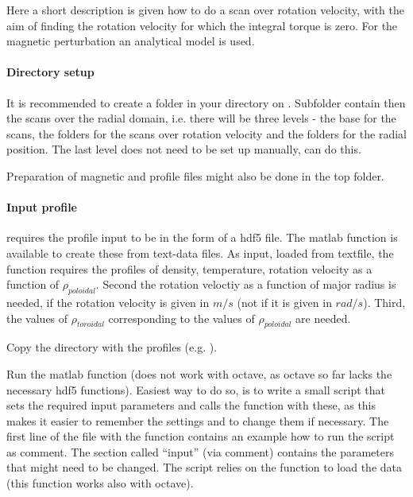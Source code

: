 Here a short description is given how to do a scan over rotation
velocity, with the aim of finding the rotation velocity for which the
integral torque is zero.
For the magnetic perturbation an analytical model is used.

\paragraph{Directory setup}
It is recommended to create a folder in your directory on .
Subfolder contain then the scans over the radial domain, i.e. there
will be three levels - the base for the scans, the folders for the scans
over rotation velocity and the folders for the radial position. The last
level does not need to be set up manually, \neotwo can do this.

Preparation of magnetic and profile files might also be done in the top
folder.

\paragraph{Input profile}
\neotwo requires the profile input to be in the form of a hdf5 file. The
matlab function  is available to create
these from text-data files. As input, loaded from textfile, the function
requires the profiles of density, temperature, rotation velocity as a
function of $\rho_{poloidal}$. Second the rotation veloctiy as a
function of major radius is needed, if the rotation velocity is given in
$m/s$ (not if it is given in $rad/s$). Third, the values of
$\rho_{toroidal}$ corresponding to the values of $\rho_{poloidal}$ are
needed.

Copy the directory with the profiles (e.g. ).

Run the matlab function  (does not
work with octave, as octave so far lacks the necessary hdf5 functions).
Easiest way to do so, is to write a small script that sets the required
input parameters and calls the function with these, as this makes it
easier to remember the settings and to change them if necessary.
The first line of the file with the function contains an example how to
run the script as comment.
The section called ``input'' (via comment) contains the parameters that
might need to be changed. The script relies on the function
 to load the data (this function works also with
octave).

